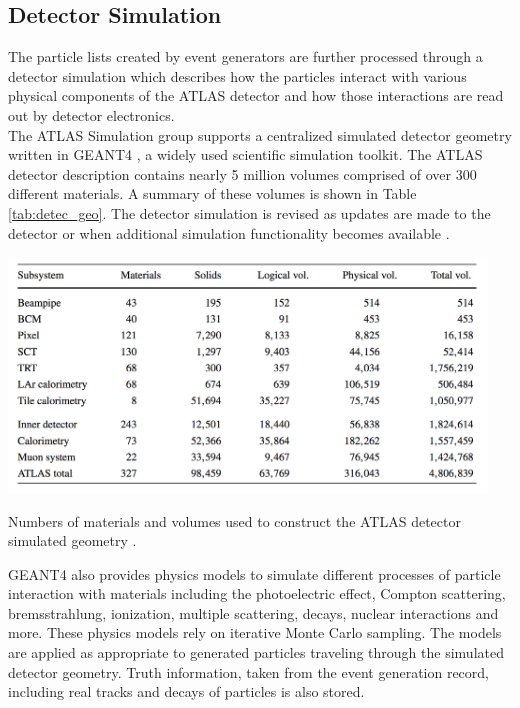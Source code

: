 \subsection{Detector Simulation}
The particle lists created by event generators are further processed through a detector simulation which describes how the particles interact with various physical components of the ATLAS detector and how those interactions are read out by detector electronics.\\

The ATLAS Simulation group supports a centralized simulated detector geometry written in GEANT4 \cite{geant4}, a widely used scientific simulation toolkit. The ATLAS detector description contains nearly 5 million volumes comprised of over 300 different materials. A summary of these volumes is shown in Table \ref{tab:detec_geo}. The detector simulation is revised as updates are made to the detector or when additional simulation functionality becomes available \cite{atlas_sim}.\\

\begin{table}
    \centering
    \includegraphics[width=5in]{figures/chapter3/detec_geo.png}
    \caption{Numbers of materials and volumes used to construct the ATLAS detector simulated geometry \cite{sim_paper}.}
    \label{tab:detec_geo}
\end{table}

GEANT4 also provides physics models to simulate different processes of particle interaction with materials including the photoelectric effect, Compton scattering, bremsstrahlung, ionization, multiple scattering, decays, nuclear interactions and more. These physics models rely on iterative Monte Carlo sampling. The models are applied as appropriate to generated particles traveling through the simulated detector geometry. Truth information, taken from the event generation record, including real tracks and decays of particles is also stored.\\

